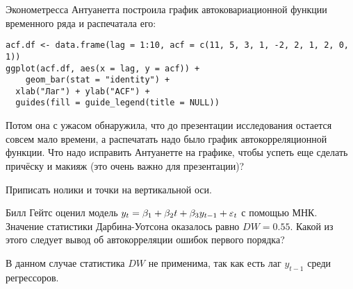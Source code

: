 \begin{problem}
Эконометресса Антуанетта построила график автоковариационной функции временного ряда и распечатала его:

\begin{verbatim}
acf.df <- data.frame(lag = 1:10, acf = c(11, 5, 3, 1, -2, 2, 1, 2, 0, 1))
ggplot(acf.df, aes(x = lag, y = acf)) +
    geom_bar(stat = "identity") +
  xlab("Лаг") + ylab("ACF") +
  guides(fill = guide_legend(title = NULL))
\end{verbatim}

\begin{minipage}{0.6\textwidth}
\begin{center}

\end{center}
\end{minipage}


Потом она с ужасом обнаружила, что до презентации исследования остается совсем мало времени, а распечатать надо было график автокорреляционной функции. Что надо исправить Антуанетте на графике, чтобы успеть еще сделать причёску и макияж (это очень важно для презентации)?


\begin{sol}
Приписать нолики и точки на вертикальной оси.
\end{sol}
\end{problem}


\begin{problem}
Билл Гейтс оценил модель $y_t=\beta_1 + \beta_2 t + \beta_3 y_{t-1} + \varepsilon_t$ с помощью МНК. Значение статистики Дарбина-Уотсона оказалось равно $DW=0.55$. Какой из этого следует вывод об автокорреляции ошибок первого порядка?


\begin{sol}
В данном случае статистика $DW$ не применима, так как есть лаг $y_{t-1}$ среди регрессоров.
\end{sol}
\end{problem}

